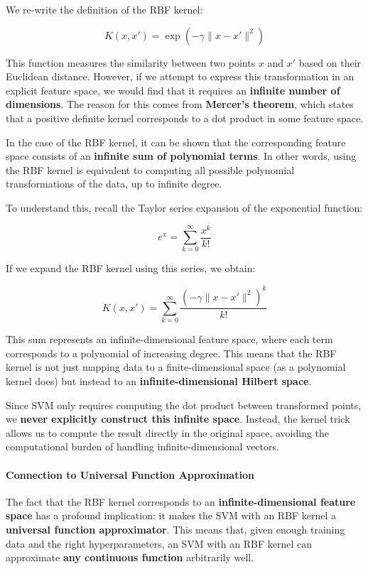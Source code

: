 \documentclass[11pt]{article}
\begin{document}
We re-write the definition of the RBF kernel:

$$
K(x, x') = \exp\left(-\gamma \|x - x'\|^2\right)
$$

This function measures the similarity between two points $ x $ and $
x' $ based on their Euclidean distance. However, if we attempt to
express this transformation in an explicit feature space, we would find
that it requires an \textbf{infinite number of dimensions}. The reason
for this comes from \textbf{Mercer's theorem}, which states that a
positive definite kernel corresponds to a dot product in some feature
space.

In the case of the RBF kernel, it can be shown that the corresponding
feature space consists of an \textbf{infinite sum of polynomial terms}.
In other words, using the RBF kernel is equivalent to computing all
possible polynomial transformations of the data, up to infinite degree.

To understand this, recall the Taylor series expansion of the
exponential function:

$$
e^x = \sum_{k=0}^{\infty} \frac{x^k}{k!}
$$

If we expand the RBF kernel using this series, we obtain:

$$
K(x, x') = \sum_{k=0}^{\infty} \frac{(-\gamma \|x - x'\|^2)^k}{k!}
$$

This sum represents an infinite-dimensional feature space, where each
term corresponds to a polynomial of increasing degree. This means that
the RBF kernel is not just mapping data to a finite-dimensional space
(as a polynomial kernel does) but instead to an
\textbf{infinite-dimensional Hilbert space}.

Since SVM only requires computing the dot product between transformed
points, we \textbf{never explicitly construct this infinite space}.
Instead, the kernel trick allows us to compute the result directly in
the original space, avoiding the computational burden of handling
infinite-dimensional vectors.

\paragraph{Connection to Universal Function
Approximation}\label{connection-to-universal-function-approximation}

The fact that the RBF kernel corresponds to an
\textbf{infinite-dimensional feature space} has a profound implication:
it makes the SVM with an RBF kernel a \textbf{universal function
approximator}. This means that, given enough training data and the right
hyperparameters, an SVM with an RBF kernel can approximate \textbf{any
continuous function} arbitrarily well.
\end{document}
